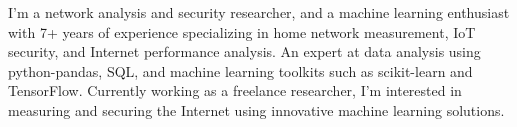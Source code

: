 
\begin{cvparagraph}

I'm a network analysis and security researcher, and a machine learning enthusiast with 7+ years of experience specializing in home network measurement, IoT security, and Internet performance analysis. An expert at data analysis using python-pandas, SQL, and machine learning toolkits such as scikit-learn and TensorFlow. Currently working as a freelance researcher, I'm interested in measuring and securing the Internet using innovative machine learning solutions.

\end{cvparagraph}





